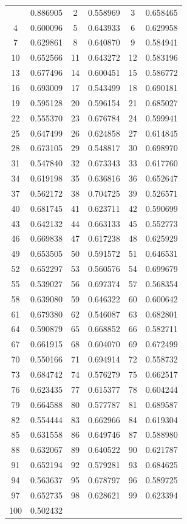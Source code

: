 \documentclass[12pt]{article}
\begin{document}
\begin{longtable}{@{}cc|cc|cc@{}}
\bottomrule
\endlastfoot
1 & 0.886905 & 2 & 0.558969 & 3 & 0.658465 \\
4 & 0.600096 & 5 & 0.643933 & 6 & 0.629958 \\
7 & 0.629861 & 8 & 0.640870 & 9 & 0.584941 \\
10 & 0.652566 & 11 & 0.643272 & 12 & 0.583196 \\
13 & 0.677496 & 14 & 0.600451 & 15 & 0.586772 \\
16 & 0.693009 & 17 & 0.543499 & 18 & 0.690181 \\
19 & 0.595128 & 20 & 0.596154 & 21 & 0.685027 \\
22 & 0.555370 & 23 & 0.676784 & 24 & 0.599941 \\
25 & 0.647499 & 26 & 0.624858 & 27 & 0.614845 \\
28 & 0.673105 & 29 & 0.548817 & 30 & 0.698970 \\
31 & 0.547840 & 32 & 0.673343 & 33 & 0.617760 \\
34 & 0.619198 & 35 & 0.636816 & 36 & 0.652647 \\
37 & 0.562172 & 38 & 0.704725 & 39 & 0.526571 \\
40 & 0.681745 & 41 & 0.623711 & 42 & 0.590699 \\
43 & 0.642132 & 44 & 0.663133 & 45 & 0.552773 \\
46 & 0.669838 & 47 & 0.617238 & 48 & 0.625929 \\
49 & 0.653505 & 50 & 0.591572 & 51 & 0.646531 \\
52 & 0.652297 & 53 & 0.560576 & 54 & 0.699679 \\
55 & 0.539027 & 56 & 0.697374 & 57 & 0.568354 \\
58 & 0.639080 & 59 & 0.646322 & 60 & 0.600642 \\
61 & 0.679380 & 62 & 0.546087 & 63 & 0.682801 \\
64 & 0.590879 & 65 & 0.668852 & 66 & 0.582711 \\
67 & 0.661915 & 68 & 0.604070 & 69 & 0.672499 \\
70 & 0.550166 & 71 & 0.694914 & 72 & 0.558732 \\
73 & 0.684742 & 74 & 0.576279 & 75 & 0.662517 \\
76 & 0.623435 & 77 & 0.615377 & 78 & 0.604244 \\
79 & 0.664588 & 80 & 0.577787 & 81 & 0.689587 \\
82 & 0.554444 & 83 & 0.662966 & 84 & 0.619304 \\
85 & 0.631558 & 86 & 0.649746 & 87 & 0.588980 \\
88 & 0.632067 & 89 & 0.640522 & 90 & 0.621787 \\
91 & 0.652194 & 92 & 0.579281 & 93 & 0.684625 \\
94 & 0.563637 & 95 & 0.678797 & 96 & 0.589725 \\
97 & 0.652735 & 98 & 0.628621 & 99 & 0.623394 \\
100 & 0.502432 &  &  &  &  \\

\end{longtable}
\end{document}

